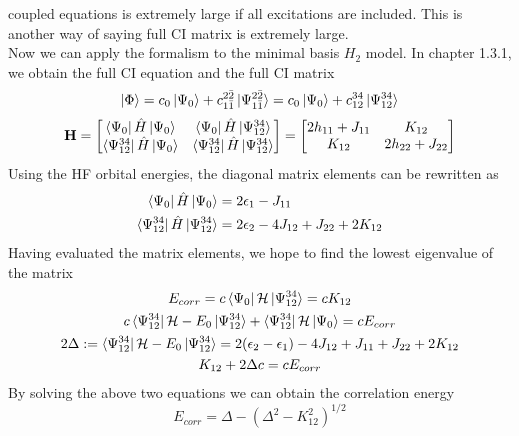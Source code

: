 \documentclass[11pt]{article}
\begin{document}
coupled equations is extremely large if all excitations are included. This is another way of saying full CI matrix is extremely large.\\
Now we can apply the formalism to the minimal basis $H_2$ model. In chapter 1.3.1, we obtain the full CI equation and the full CI matrix
\begin{equation}
    \ket{\Phi}=c_0\ket{\Psi_0}+c_{1\bar{1}}^{2\bar{2}}\ket{\Psi_{1\bar{1}}^{2\bar{2}}}=c_0\ket{\Psi_0}+c_{12}^{34}\ket{\Psi_{12}^{34}}
\end{equation}
\begin{equation}
    \mathbf{H}=
    \begin{bmatrix}
        \bra{\Psi_0}\Hat{H}\ket{\Psi_0} & \bra{\Psi_0}\Hat{H}\ket{\Psi_{12}^{34}}\\
        \bra{\Psi_{12}^{34}}\Hat{H}\ket{\Psi_0} & \bra{\Psi_{12}^{34}}\Hat{H}\ket{\Psi_{12}^{34}}
    \end{bmatrix}
    =
    \begin{bmatrix}
        2h_{11}+J_{11} & K_{12}\\
        K_{12} & 2h_{22}+J_{22}
    \end{bmatrix}
\end{equation}
Using the HF orbital energies, the diagonal matrix elements can be rewritten as
\begin{align}
    \bra{\Psi_0}\Hat{H}\ket{\Psi_0}&=2\epsilon_1-J_{11}\\
    \bra{\Psi_{12}^{34}}\Hat{H}\ket{\Psi_{12}^{34}}&=2\epsilon_2-4J_{12}+J_{22}+2K_{12}
\end{align}
Having evaluated the matrix elements, we hope to find the lowest eigenvalue of the matrix
\begin{gather}
    E_{corr}=c\bra{\Psi_0}\mathcal{H}\ket{\Psi_{12}^{34}}=cK_{12}\\
    c\bra{\Psi_{12}^{34}}\mathcal{H}-E_0\ket{\Psi_{12}^{34}}+\bra{\Psi_{12}^{34}}\mathcal{H}\ket{\Psi_0}=cE_{corr}\notag\\
    2\Delta:=\bra{\Psi_{12}^{34}}\mathcal{H}-E_0\ket{\Psi_{12}^{34}}=2(\epsilon_2-\epsilon_1)-4J_{12}+J_{11}+J_{22}+2K_{12}\notag \\
    K_{12}+2\Delta c=cE_{corr}
\end{gather}
By solving the above two equations we can obtain the correlation energy
\begin{equation}
    E_{corr}=\Delta-{(\Delta^2-K^2_{12})}^{1/2}
\end{equation}
\end{document}
